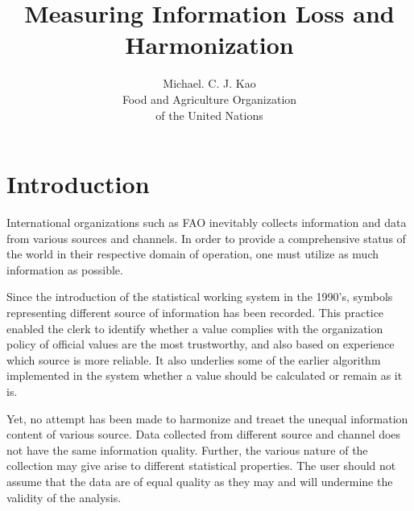 \documentclass[nojss]{jss}
\title{\bf Measuring Information Loss and Harmonization}
\author{Michael. C. J. Kao\\ Food and Agriculture Organization \\ of
  the United Nations}
\begin{document}
\section{Introduction}









International organizations such as FAO inevitably collects
information and data from various sources and channels. In order to
provide a comprehensive status of the world in their respective domain
of operation, one must utilize as much information as possible.


Since the introduction of the statistical working system in the
1990's, symbols representing different source of information has been
recorded. This practice enabled the clerk to identify whether a value
complies with the organization policy of official values are the most
trustworthy, and also based on experience which source is more
reliable. It also underlies some of the earlier algorithm implemented
in the system whether a value should be calculated or remain as it is.


Yet, no attempt has been made to harmonize and treaet the unequal
information content of various source. Data collected from different
source and channel does not have the same information
quality. Further, the various nature of the collection may give arise
to different statistical properties. The user should not assume that
the data are of equal quality as they may and will undermine the
validity of the analysis.
\end{document}
